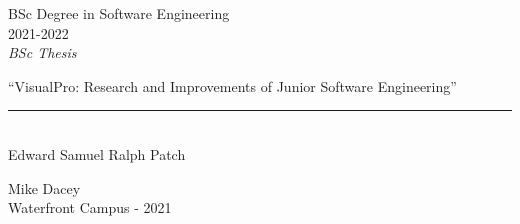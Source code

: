\documentclass[12pt]{report} %
\begin{document}
	
\begin{titlepage}
	\begin{sffamily}
	\color{azulUC3M}
	\begin{center}
		\begin{figure}[H] %
		\end{figure}
		\vspace{2.5cm}
		\begin{Large}
			BSc Degree in Software Engineering\\			
			 2021-2022\\ %
			\vspace{2cm}		
			\textsl{BSc Thesis}
			\bigskip
			
		\end{Large}
		 	{\Huge ``VisualPro: Research and Improvements of Junior Software Engineering''}\\
		 	\vspace*{0.5cm}
	 		\rule{10.5cm}{0.1mm}\\
			\vspace*{0.9cm}
			{\LARGE Edward Samuel Ralph Patch}\\ 
			\vspace*{1cm}
		\begin{Large}
			Mike Dacey\\
			Waterfront Campus - 2021\\
		\end{Large}
	\end{center}
	\vfill
	\color{black}
	
	\end{sffamily}
\end{titlepage}

\newpage %
\thispagestyle{empty}
\mbox{}

\newpage %
\thispagestyle{empty}
\mbox{}
\end{document}
